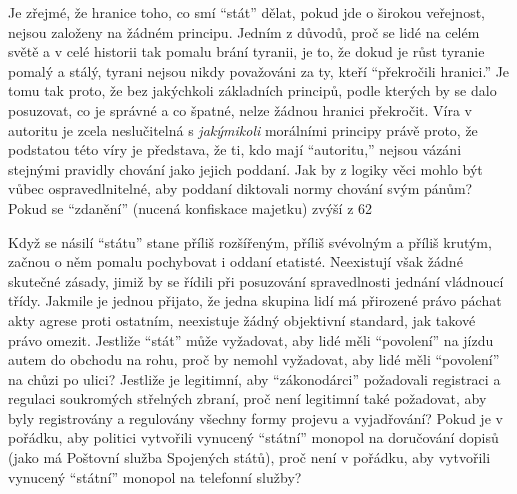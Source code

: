 \documentclass{book}
\begin{document}
Je zřejmé, že hranice toho, co smí \enquote{stát} dělat, pokud jde o širokou veřejnost, nejsou založeny na žádném principu. Jedním z důvodů, proč se lidé na celém světě a v celé historii tak pomalu brání tyranii, je to, že dokud je růst tyranie pomalý a stálý, tyrani nejsou nikdy považováni za ty, kteří \enquote{překročili hranici.} Je tomu tak proto, že bez jakýchkoli základních principů, podle kterých by se dalo posuzovat, co je správné a co špatné, nelze žádnou hranici překročit. Víra v autoritu je zcela neslučitelná s \emph{jakýmikoli} morálními principy právě proto, že podstatou této víry je představa, že ti, kdo mají \enquote{autoritu,} nejsou vázáni stejnými pravidly chování jako jejich poddaní. Jak by z logiky věci mohlo být vůbec ospravedlnitelné, aby poddaní diktovali normy chování svým pánům? Pokud se \enquote{zdanění} (nucená konfiskace majetku) zvýší z 62 %

Když se násilí \enquote{státu} stane příliš rozšířeným, příliš svévolným a příliš krutým, začnou o něm pomalu pochybovat i oddaní etatisté. Neexistují však žádné skutečné zásady, jimiž by se řídili při posuzování spravedlnosti jednání vládnoucí třídy. Jakmile je jednou přijato, že jedna skupina lidí má přirozené právo páchat akty agrese proti ostatním, neexistuje žádný objektivní standard, jak takové právo omezit. Jestliže \enquote{stát} může vyžadovat, aby lidé měli \enquote{povolení} na jízdu autem do obchodu na rohu, proč by nemohl vyžadovat, aby lidé měli \enquote{povolení} na chůzi po ulici? Jestliže je legitimní, aby \enquote{zákonodárci} požadovali registraci a regulaci soukromých střelných zbraní, proč není legitimní také požadovat, aby byly registrovány a regulovány všechny formy projevu a vyjadřování? Pokud je v pořádku, aby politici vytvořili vynucený \enquote{státní} monopol na doručování dopisů (jako má Poštovní služba Spojených států), proč není v pořádku, aby vytvořili vynucený \enquote{státní} monopol na telefonní služby?
\end{document}
